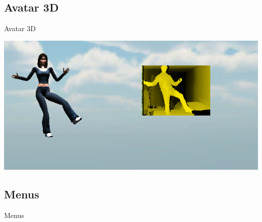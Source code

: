 \subsection{Avatar 3D}
\begin{frame}{Avatar 3D}
\begin{center}
\includegraphics[width=0.9\linewidth]{../images/avatar3D}
\end{center}
\end{frame}

\subsection{Menus}
\begin{frame}{Menus}
\begin{center}
\end{center}
\end{frame}

